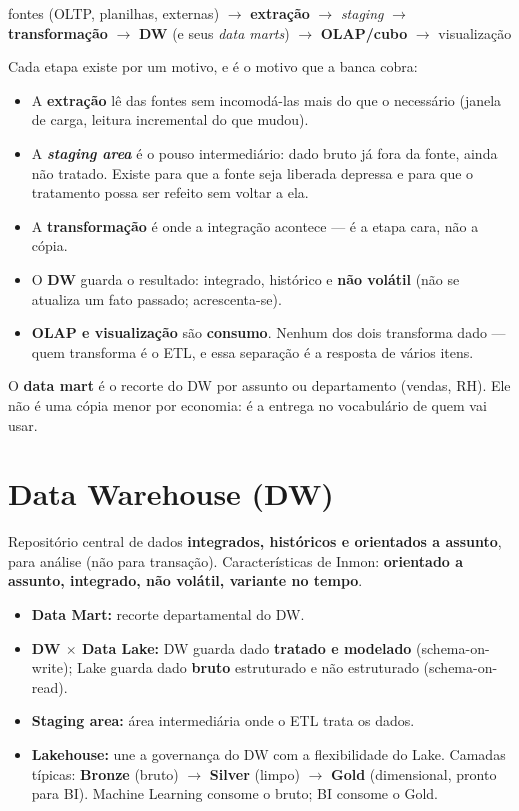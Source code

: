 \begin{conceito}
\begin{center}
fontes (OLTP, planilhas, externas) $\to$ \textbf{extração} $\to$
\emph{staging} $\to$ \textbf{transformação} $\to$ \textbf{DW} (e seus
\emph{data marts}) $\to$ \textbf{OLAP/cubo} $\to$ visualização
\end{center}

Cada etapa existe por um motivo, e é o motivo que a banca cobra:

\begin{itemize}
\item A \textbf{extração} lê das fontes sem incomodá-las mais do que o
necessário (janela de carga, leitura incremental do que mudou).
\item A \emph{\textbf{staging area}} é o pouso intermediário: dado bruto já
fora da fonte, ainda não tratado. Existe para que a fonte seja liberada
depressa e para que o tratamento possa ser refeito sem voltar a ela.
\item A \textbf{transformação} é onde a integração acontece --- é a etapa cara,
não a cópia.
\item O \textbf{DW} guarda o resultado: integrado, histórico e
\textbf{não volátil} (não se atualiza um fato passado; acrescenta-se).
\item \textbf{OLAP e visualização} são \textbf{consumo}. Nenhum dos dois
transforma dado --- quem transforma é o ETL, e essa separação é a resposta de
vários itens.
\end{itemize}

O \textbf{data mart} é o recorte do DW por assunto ou departamento (vendas,
RH). Ele não é uma cópia menor por economia: é a entrega no vocabulário de quem
vai usar.
\end{conceito}

\section{Data Warehouse (DW)}

Repositório central de dados \textbf{integrados, históricos e orientados a
assunto}, para análise (não para transação). Características de Inmon:
\textbf{orientado a assunto, integrado, não volátil, variante no tempo}.

\begin{itemize}
\item \textbf{Data Mart:} recorte departamental do DW.
\item \textbf{DW $\times$ Data Lake:} DW guarda dado \textbf{tratado e
modelado} (schema-on-write); Lake guarda dado \textbf{bruto} estruturado e
não estruturado (schema-on-read).
\item \textbf{Staging area:} área intermediária onde o ETL trata os dados.
\item \textbf{Lakehouse:} une a governança do DW com a flexibilidade do
Lake. Camadas típicas: \textbf{Bronze} (bruto) $\to$ \textbf{Silver} (limpo)
$\to$ \textbf{Gold} (dimensional, pronto para BI). Machine Learning consome o
bruto; BI consome o Gold.
\end{itemize}

